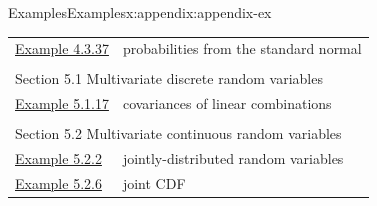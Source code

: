 \documentclass[oneside,10pt,]{book}
\numberwithin{equation}{section}
\begin{document}
\begin{appendixptx}{Examples}{}{Examples}{}{}{x:appendix:appendix-ex}
\begin{longtable}[l]{ll}
\hyperref[x:example:ex-std-norm-probs2]{Example 4.3.37}& probabilities from the standard normal\\
\multicolumn{2}{l}{\null}\\[1.5ex] \multicolumn{2}{l}{\large Section 5.1 Multivariate discrete random variables}\\[0.5ex]
\hyperref[x:example:ex-var-covar]{Example 5.1.17}& covariances of linear combinations\\
\multicolumn{2}{l}{\null}\\[1.5ex] \multicolumn{2}{l}{\large Section 5.2 Multivariate continuous random variables}\\[0.5ex]
\hyperref[x:example:ex-joint]{Example 5.2.2}& jointly-distributed random variables\\
\hyperref[x:example:ex-joint-cdf]{Example 5.2.6}& joint CDF\\
\end{longtable}
\end{appendixptx}
%
%
\typeout{************************************************}
\typeout{************************************************}
%
\end{document}
